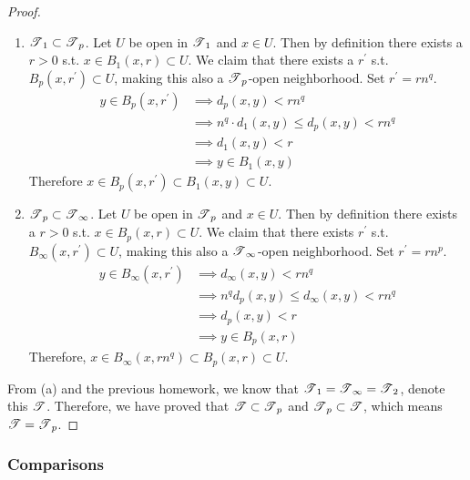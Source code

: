 \begin{proof}
        \begin{enumerate} 
          \item $\T_1 \subset \T_p$. Let $U$ be open in $\T_1$ and $x \in U$. Then by definition there exists a $r > 0$ s.t. $x \in B_1 (x, r) \subset U$. We claim that there exists a $r^\prime$ s.t. $B_p (x, r^\prime) \subset U$, making this also a $\T_p$-open neighborhood. Set $r^\prime = r n^q$. 
          \begin{align}
            y \in B_p (x, r^\prime) & \implies d_p (x, y) < r n^q \\
                                    & \implies n^q \cdot d_1 (x, y) \leq d_p (x, y) < r n^q \\
                                    & \implies d_1 (x, y) < r \\
                                    & \implies y \in B_1 (x, y)
          \end{align}
          Therefore $x \in B_p (x, r^\prime) \subset B_1 (x, y) \subset U$. 

          \item $\T_p \subset \T_\infty$. Let $U$ be open in $\T_p$ and $x \in U$. Then by definition there exists a $r > 0$ s.t. $x \in B_p (x, r) \subset U$. We claim that there exists $r^\prime$ s.t. $B_\infty (x, r^\prime) \subset U$, making this also a $\T_\infty$-open neighborhood. Set $r^\prime = r n^p$. 
          \begin{align}
            y \in B_\infty (x, r^\prime) & \implies d_\infty (x, y) < r n^q \\
                                         & \implies n^q d_p (x, y) \leq d_\infty (x, y) < r n^q  \\
                                         & \implies d_p (x, y) < r \\
                                         & \implies y \in B_p (x, r)
          \end{align}
          Therefore, $x \in B_\infty (x, r n^q) \subset B_p (x, r) \subset U$. 
        \end{enumerate} 

        From (a) and the previous homework, we know that $\T_1 = \T_\infty = \T_2$, denote this $\T$. Therefore, we have proved that $\T \subset \T_p$ and $\T_p \subset \T$, which means $\T = \T_p$. 
      \end{proof}

    \subsubsection{Comparisons} 


